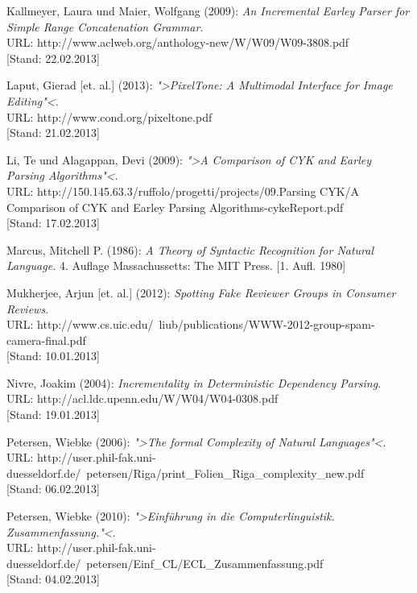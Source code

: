 \documentclass[12pt,a4paper]{article}
\theoremstyle{definition}
\begin{document}
\begin{thebibliography}{99}
		Kallmeyer, Laura und Maier, Wolfgang (2009):
		\emph{An Incremental Earley Parser for Simple Range Concatenation Grammar}.\\
		URL: http://www.aclweb.org/anthology-new/W/W09/W09-3808.pdf\\
		{[Stand: 22.02.2013]}
	
		Laput, Gierad [et. al.] (2013):
		\emph{">PixelTone: A Multimodal Interface for Image Editing"<}.\\
		URL: http://www.cond.org/pixeltone.pdf\\
		{[Stand: 21.02.2013]}
	
		Li, Te und Alagappan, Devi (2009):
		\emph{">A Comparison of CYK and Earley Parsing Algorithms"<}.\\
		URL: http://150.145.63.3/ruffolo/progetti/projects/09.Parsing CYK/A Comparison of CYK and Earley Parsing Algorithms-cykeReport.pdf\\
		{[Stand: 17.02.2013]}
	
		Marcus, Mitchell P. (1986):
		\emph{A Theory of Syntactic Recognition for Natural Language.}
		4. Auflage
		Massachussetts: The MIT Press. [1. Aufl. 1980]

		Mukherjee, Arjun [et. al.] (2012):
		\emph{Spotting Fake Reviewer Groups in Consumer Reviews}.\\
		URL: http://www.cs.uic.edu/~liub/publications/WWW-2012-group-spam-camera-final.pdf\\
		{[Stand: 10.01.2013]}

		Nivre, Joakim (2004):
		\emph{Incrementality in Deterministic Dependency Parsing}.\\
		URL: http://acl.ldc.upenn.edu/W/W04/W04-0308.pdf\\
		{[Stand: 19.01.2013]}

		Petersen, Wiebke (2006):
		\emph{">The formal Complexity of Natural Languages"<}.\\
		URL: http://user.phil-fak.uni-duesseldorf.de/~petersen/Riga/print\_Folien\_Riga\_complexity\_new.pdf\\
		{[Stand: 06.02.2013]}

		Petersen, Wiebke (2010):
		\emph{">Einführung in die Computerlinguistik. Zusammenfassung."<}.\\
		URL: http://user.phil-fak.uni-duesseldorf.de/~petersen/Einf\_CL/ECL\_Zusammenfassung.pdf\\
		{[Stand: 04.02.2013]}


\end{thebibliography}
\end{document}
